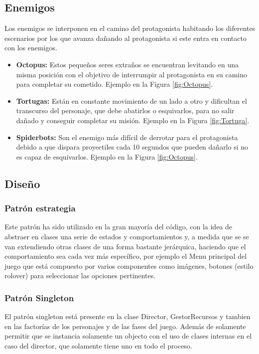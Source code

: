 \subsection{Enemigos}
Los enemigos se interponen en el camino del protagonista habitando los diferentes escenarios por los que avanza dañando al protagonista si este entra en contacto con los enemigos. 
\begin{itemize}
    \item \textbf{Octopus:} Estos pequeños seres extraños se encuentran levitando en una misma posición con el objetivo de interrumpir al protagonista en su camino para completar su cometido. Ejemplo en la Figura \ref{fig:Octopus}.
    \item \textbf{Tortugas:} Están en constante movimiento de un lado a otro y dificultan el transcurso del personaje, que debe abatirlos o esquivarlos, para no salir dañado y conseguir completar su misión. Ejemplo en la Figura \ref{fig:Tortuga}.
    \item \textbf{Spiderbots:} Son el enemigo más difícil de derrotar para el protagonista debido a que dispara proyectiles cada 10 segundos que pueden dañarlo si no es capaz de esquivarlos. Ejemplo en la Figura \ref{fig:Octopus}. 
\end{itemize}

\subsection{Diseño}
\subsubsection{Patrón estrategia}
Este patrón ha sido utilizado en la gran mayoría del código, con la idea de abstraer en clases una serie de estados y comportamientos y, a medida que se se van extendiendo otras clases de una forma bastante jerárquica, haciendo que el comportamiento sea cada vez más específico, por ejemplo el Menu principal del juego que está compuesto por varios componentes como imágenes, botones (estilo rolover) para seleccionar las opciones pertinentes.

\subsubsection{Patrón Singleton}
El patrón singleton está presente en la clase Director, GestorRecursos y tambien en las factorías de los personajes y de las fases del juego. Además de solamente permitir que se instancia solamente un objecto con el uso de clases internas en el caso del director, que solamente tiene uno en todo el proceso.

